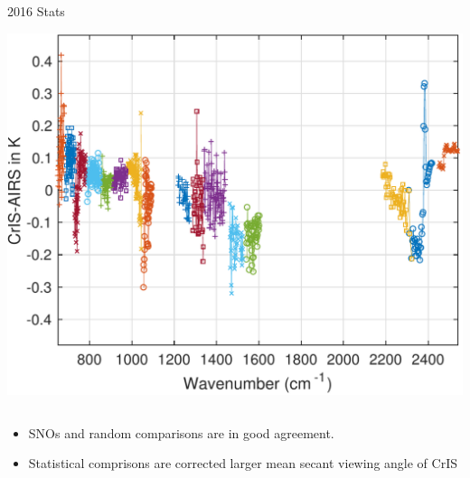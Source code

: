 \documentclass[10pt,t]{beamer}
\begin{document}
\begin{frame}
\begin{columns}
    \begin{column}{0.55\columnwidth}
      \begin{block}{2016 Stats}
\vspace{-0.15in}
        \begin{center}
          \includegraphics[width=\linewidth]{./Figs/snpp_vs_airs_stats.pdf} 
        \end{center}
      \end{block}
    \end{column}
  \end{columns}
  \small
  \begin{itemize}
  \item SNOs and random comparisons are in good agreement.
  \item Statistical comprisons are corrected larger mean secant viewing angle of CrIS
  \end{itemize}
\end{frame}
\end{document}

